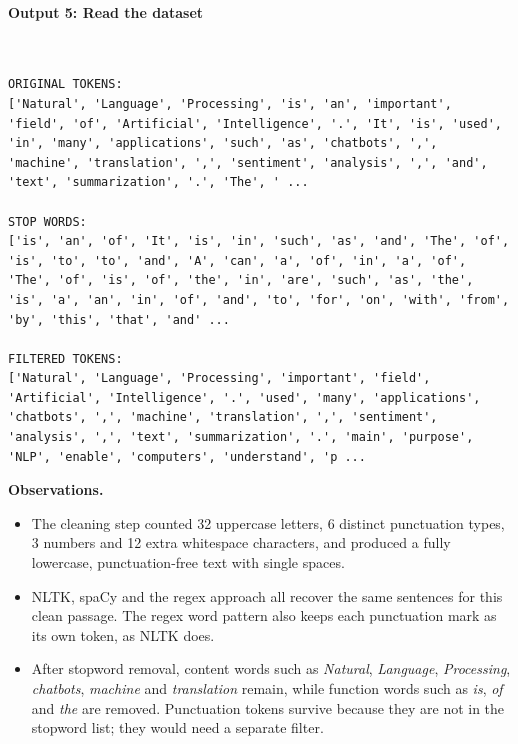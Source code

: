 \documentclass[12pt,a4paper,oneside]{report}
\providecommand{\tightlist}{\setlength{\itemsep}{0pt}\setlength{\parskip}{0pt}}
\begin{document}
\paragraph{Output 5: Read the dataset}\mbox{}\\[-1ex]
\begin{Verbatim}[commandchars=\\\{\},breaklines=true,breakanywhere=true,fontsize=\scriptsize,frame=leftline,framesep=2mm,rulecolor=\color{gray}]
ORIGINAL TOKENS:
['Natural', 'Language', 'Processing', 'is', 'an', 'important', 'field', 'of', 'Artificial', 'Intelligence', '.', 'It', 'is', 'used', 'in', 'many', 'applications', 'such', 'as', 'chatbots', ',', 'machine', 'translation', ',', 'sentiment', 'analysis', ',', 'and', 'text', 'summarization', '.', 'The', ' ...

STOP WORDS:
['is', 'an', 'of', 'It', 'is', 'in', 'such', 'as', 'and', 'The', 'of', 'is', 'to', 'to', 'and', 'A', 'can', 'a', 'of', 'in', 'a', 'of', 'The', 'of', 'is', 'of', 'the', 'in', 'are', 'such', 'as', 'the', 'is', 'a', 'an', 'in', 'of', 'and', 'to', 'for', 'on', 'with', 'from', 'by', 'this', 'that', 'and' ...

FILTERED TOKENS:
['Natural', 'Language', 'Processing', 'important', 'field', 'Artificial', 'Intelligence', '.', 'used', 'many', 'applications', 'chatbots', ',', 'machine', 'translation', ',', 'sentiment', 'analysis', ',', 'text', 'summarization', '.', 'main', 'purpose', 'NLP', 'enable', 'computers', 'understand', 'p ...
\end{Verbatim}
\textbf{Observations.}

\begin{itemize}
\tightlist
\item
  The cleaning step counted 32 uppercase letters, 6 distinct punctuation types, 3 numbers and 12 extra whitespace characters, and produced a fully lowercase, punctuation-free text with single spaces.
\item
  NLTK, spaCy and the regex approach all recover the same sentences for this clean passage. The regex word pattern also keeps each punctuation mark as its own token, as NLTK does.
\item
  After stopword removal, content words such as \emph{Natural}, \emph{Language}, \emph{Processing}, \emph{chatbots}, \emph{machine} and \emph{translation} remain, while function words such as \emph{is}, \emph{of} and \emph{the} are removed. Punctuation tokens survive because they are not in the stopword list; they would need a separate filter.
\end{itemize}
\end{document}
